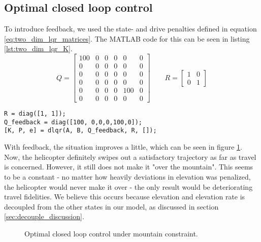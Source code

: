 \subsection{Optimal closed loop control}
To introduce feedback, we used the state- and drive penalties defined in equation \ref{eq:two_dim_lqr_matrices}. The MATLAB code for this can be seen in listing \ref{lst:two_dim_lqr_K}.
\begin{equation}\label{eq:two_dim_lqr_matrices}
    Q = \begin{bmatrix}
        100 & 0 & 0 & 0 & 0 & 0\\
        0 & 0 & 0 & 0 & 0 & 0\\
        0 & 0 & 0 & 0 & 0 & 0\\
        0 & 0 & 0 & 0 & 0 & 0\\
        0 & 0 & 0 & 0 & 100 & 0\\
        0 & 0 & 0 & 0 & 0 & 0
    \end{bmatrix}\qquad
    R = \begin{bmatrix}
        1 & 0\\
        0 & 1
    \end{bmatrix}
\end{equation}
\begin{lstlisting}[caption=MATLAB code to generate LQR feedback.,label=lst:two_dim_lqr_K]
%% Generate K for feedback under optimal control
R = diag([1, 1]);
Q_feedback = diag([100, 0,0,0,100,0]);
[K, P, e] = dlqr(A, B, Q_feedback, R, []);
\end{lstlisting}
With feedback, the situation improves a little, which can be seen in figure \ref{fig:two_dim_closed_loop}. Now, the helicopter definitely swipes out a satisfactory trajectory as far as travel is concerned. However, it still does not make it "over the mountain". This seems to be a constant - no matter how heavily deviations in elevation was penalized, the helicopter would never make it over - the only result would be deteriorating travel fidelities. We believe this occurs because elevation and elevation rate is decoupled from the other states in our model, as discussed in section \ref{sec:decouple_discussion}.
\begin{figure} 
        \centering
        \setlength{\figureheight}{6cm}
        \setlength{\figurewidth}{10cm}
        
        \caption{Optimal closed loop control under mountain constraint.} 
\label{fig:two_dim_closed_loop} 
\end{figure}
